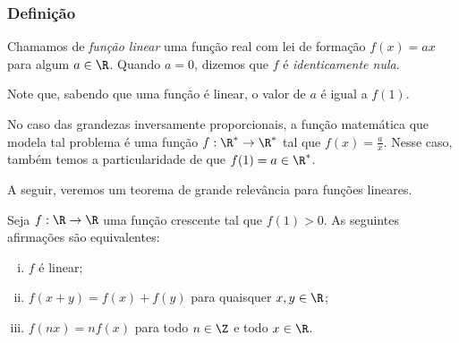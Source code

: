 \subsubsection{Definição}

\begin{definition}
    Chamamos de \emph{função linear} uma função real com lei de formação
$f(x) = ax$ para algum $a \in \R$. Quando $a = 0$, dizemos que $f$ é \emph{identicamente nula}.
\end{definition}

\begin{remark}
Note que, sabendo que uma função é linear, o valor de $a$ é igual a
$f(1)$.
\end{remark}

No caso das grandezas inversamente proporcionais, a função
matemática que modela tal problema é uma função $f: \R^* \to
\R^*$ tal que $f(x) = \frac a x$. 
Nesse caso, também temos a
particularidade de que $f(1) = a \in \R^*$.

A seguir, veremos um teorema de grande relevância para funções lineares.

\begin{theorem}
\label{def:teorema-fundamental-proporcionalidade}
Seja $f: \R \to \R$ uma função crescente tal que $f(1)>0$. 
As seguintes afirmações são equivalentes:
%
\begin{enumerate}[(i)]
  \item $f$ é linear;
  \item $f(x+y) = f(x) + f(y)$ para quaisquer $x, y \in \R$;
  \item $f(nx) = nf(x)$ para todo $n \in \Z$ e todo $x \in \R$.
\end{enumerate}
\end{theorem}

